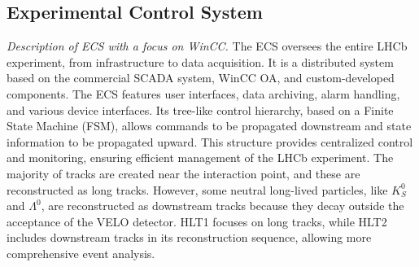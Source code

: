 \subsection{Experimental Control System}
\textit{Description of ECS with a focus on WinCC.
}
The ECS oversees the entire LHCb experiment, from infrastructure to data acquisition. It is a distributed system based on the commercial SCADA system, WinCC OA, and custom-developed components. The ECS features user interfaces, data archiving, alarm handling, and various device interfaces. Its tree-like control hierarchy, based on a Finite State Machine (FSM), allows commands to be propagated downstream and state information to be propagated upward. This structure provides centralized control and monitoring, ensuring efficient management of the LHCb experiment.
The majority of tracks are created near the interaction point, and these are reconstructed as long tracks. However, some neutral long-lived particles, like $K^0_S$ and $\Lambda^0$, are reconstructed as downstream tracks because they decay outside the acceptance of the VELO detector. HLT1 focuses on long tracks, while HLT2 includes downstream tracks in its reconstruction sequence, allowing more comprehensive event analysis.



